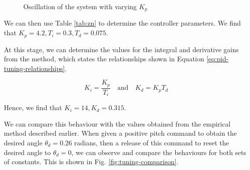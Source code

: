 \documentclass[12pt]{article}
\begin{document}
\begin{figure}[H]
\begin{subfigure}{.4\textwidth}
\end{subfigure}
    \caption{Oscillation of the system with varying $K_p$}
    \label{fig:zn-tuning}
\end{figure}

We can then use Table \ref{tab:zn} to determine the controller parameters. We find that $K_p = 4.2, T_i = 0.3, T_d = 0.075$.

At this stage, we can determine the values for the integral and derivative gains from the method, which states the relationships shown in Equation \ref{eq:pid-tuning-relationships}.

\begin{equation}
    \label{eq:pid-tuning-relationships}
    K_i = \frac{K_p}{T_i}
    \quad \text{and} \quad
    K_d = K_pT_d
\end{equation}

Hence, we find that $K_i = 14, K_d = 0.315$.

We can compare this behaviour with the values obtained from the empirical method described earlier. When given a positive pitch command to obtain the desired angle $\theta_d = 0.26$ radians, then a release of this command to reset the desired angle to $\theta_d = 0$, we can observe and compare the behaviours for both sets of constants. This is shown in Fig. \ref{fig:tuning-comparison}.
\end{document}
